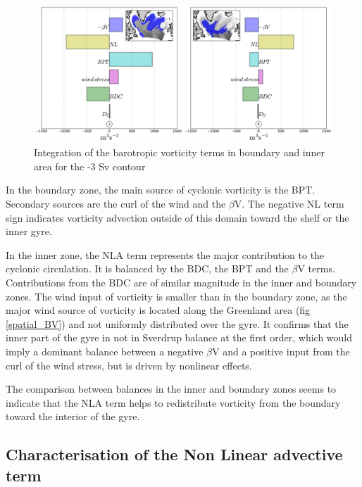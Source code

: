 \documentclass[11pt,a4paper]{article}
\begin{document}
\begin{figure}[H]
\centerline{\includegraphics[width=15cm]{./v_b/BV_int_bound_inner_3sv.png}}
\caption{Integration of the barotropic vorticity terms in boundary and inner area for the -3 Sv contour}
\label{int_bound_inner_BV}
\end{figure} 

In the boundary zone, the main source of cyclonic vorticity is the BPT. Secondary sources are the curl of the wind and the $\beta$V. The negative NL term sign indicates vorticity advection outside of this domain toward the shelf or the inner gyre.

In the inner zone, the NLA term represents the major contribution to the cyclonic circulation. It is balanced by the BDC, the BPT and the $\beta$V terms.  Contributions from the BDC are of similar magnitude in the inner and boundary zones.  The wind input of vorticity is smaller than in the boundary zone, as the major wind source of vorticity is located along the Greenland area (fig \ref{spatial_BV}) and not uniformly distributed over the gyre. It confirms that the inner part of the gyre in not in Sverdrup balance at the first order, which would imply a dominant balance between a negative $\beta$V and a positive input from the curl of the wind stress, but is driven by nonlinear effects.


The comparison between balances in the inner and boundary zones seems to indicate that the NLA term helps to redistribute vorticity from the boundary toward the interior of the gyre. %

\subsection{Characterisation of the Non Linear advective term}
\end{document}
